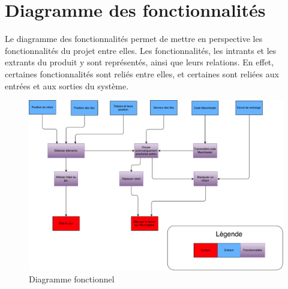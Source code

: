 \chapter{Diagramme des fonctionnalités}

Le diagramme des fonctionnalités permet de mettre en perspective les fonctionnalités du projet entre elles. Les fonctionnalités, les intrants et les extrants du produit y sont représentés,
ainsi que leurs relations. En effet, certaines fonctionnalités sont reliés entre elles, et certaines sont reliées aux entrées et aux sorties du système.

\begin{figure}[h]
  \centering
  \includegraphics[scale=0.4]{resources/diag_fonc.pdf}
  \caption{Diagramme fonctionnel}
\end{figure}
